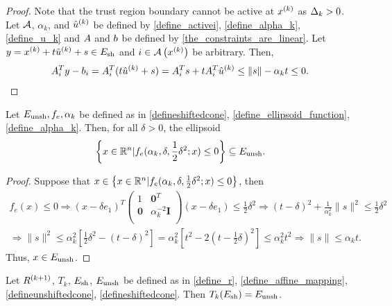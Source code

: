 \begin{proof}
Note that the trust region boundary cannot be active at $x^{(k)}$ as $\Delta_k > 0$.
Let ${\mathcal A}$, $\alpha_k$, and ${{{\hat u}^{(k)}}}$ be defined by \cref{define_activei}, \cref{define_alpha_k}, \cref{define_u_k} and
${A}$ and ${b}$ be defined by \cref{the_constraints_are_linear}.
Let $y = x^{(k)} + t{{{\hat u}^{(k)}}} + s \in {E_{\textrm{sh}}}$ and $i \in {\mathcal A}\left(x^{(k)}\right)$ be arbitrary.
Then,
\begin{align*}
{{A}}_{i}^Ty - {{b}}_{i} = {{A}}_{i}^T(t{{{\hat u}^{(k)}}} + s) = {{A}}_{i}^Ts + t {{A}}_{i}^T{{{\hat u}^{(k)}}} \le \|s\| - \alpha_k t \le 0.
\end{align*}
\end{proof}




\begin{lemma}
\label{shifted_ellipsoid_in_cone}
Let ${E_{\textrm{unsh}}}, f_e, \alpha_k$ be defined as in \cref{defineshiftedcone}, \cref{define_ellipsoid_function}, \cref{define_alpha_k}.
Then, for all $\delta > 0$, the ellipsoid
\begin{align}
\left\{x \in \mathbb R^n | f_e(\alpha_k, \delta, \frac 1 2 \delta^2; x) \le 0 \right\} \subseteq {E_{\textrm{unsh}}}.
\end{align}
\end{lemma}

\begin{proof}
Suppose that $x \in \left\{x \in \mathbb R^n | f_e(\alpha_k, \delta, \frac 1 2 \delta^2; x) \le 0 \right\}$, then
\begin{align*}
f_e(x) \le 0 \Longrightarrow 
(x - \delta e_1)^T\begin{pmatrix}
1 & \boldsymbol0^T \\
\boldsymbol 0 & \alpha_k^{-2} \boldsymbol I \\
\end{pmatrix}(x - \delta e_1) \le \frac 1 2 \delta^2 
\Longrightarrow (t - \delta)^2 + \frac {1} {\alpha_k^2} \|s\|^2 \le \frac 1 2 \delta^2 \\
\Longrightarrow \|s\|^2 \le \alpha_k^2 \left[\frac 1 2 \delta^2 - (t - \delta)^2\right] 
= \alpha_k^2 \left[t^2 - 2(t - \frac 1 2 \delta)^2 \right] \le \alpha_k^2t^2
\Longrightarrow \|s\| \le \alpha_k t.
\end{align*}
Thus, $x \in{E_{\textrm{unsh}}}$.
\end{proof}


\begin{lemma}
\label{linear_mapping_works}
Let ${R^{(k+1)}}$, $T_k$, ${E_{\textrm{sh}}}$, ${E_{\textrm{unsh}}}$ be defined as in
\cref{define_r}, \cref{define_affine_mapping}, \cref{defineunshiftedcone}, \cref{defineshiftedcone}.
Then $T_k({E_{\textrm{sh}}}) = {E_{\textrm{unsh}}}$.
\end{lemma}

